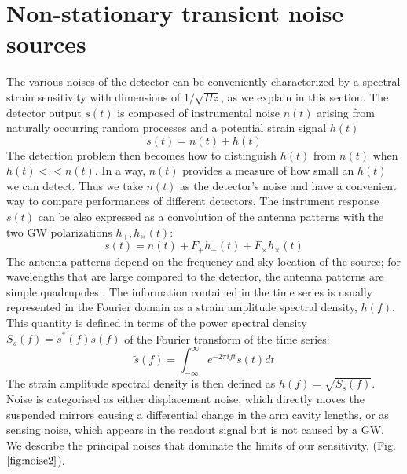 \documentclass[binding=0.6cm, LaM]{sapthesis}
\begin{document}
\section{Non-stationary transient noise sources}
	
	The various noises of the detector can be conveniently characterized by a spectral strain
        sensitivity with dimensions of $1/\sqrt{Hz}$, as we explain in this section. 
        The detector output $s(t)$ is composed of instrumental noise $n(t)$ arising from
        naturally occurring random processes and a potential strain signal $h(t)$
                \begin{equation}
                	s(t) = n(t) + h(t)
                \end{equation}
        The detection problem then becomes how to distinguish $h(t)$ from $n(t)$ when $h(t) << n(t)$.
        In a way, $n(t)$ provides a measure of how small an $h(t)$ we can detect.
        Thus we take $n(t)$ as the detector’s noise and have a convenient way to
        compare performances of different detectors.
	The instrument response $s(t)$ can be also expressed as a convolution of the antenna patterns 
	with the two GW polarizations $h_{+}, h_{\times}(t)$:
		\begin{equation}
			s(t) = n(t) +  F_{+}h_{+} (t) + F_{\times}h_{\times}(t)
		\end{equation} 
	The antenna patterns depend on the frequency and sky location of the source; 
	for wavelengths that are large compared to the detector, the antenna patterns are simple quadrupoles \cite{19}.
	The information contained in the time series is usually represented in the Fourier domain 
	as a strain amplitude spectral density, $h(f)$. \\
	This quantity is defined in terms of the power spectral density $S_s(f) = \tilde s^{*}(f) \tilde s(f)$
	of the Fourier transform of the time series:
		\begin{equation}
                	\tilde s(f) = \int^{\infty}_{-\infty} e^{-2 \pi ift} s(t)dt
		\end{equation}
	The strain amplitude spectral density is then defined as $h(f) = \sqrt{S_s(f)}$.
	Noise is categorised as either displacement noise, which directly moves the suspended mirrors
        causing a differential change in the arm cavity lengths, or as sensing noise,
        which appears in the readout signal but is not caused by a GW. \\
        We describe the principal noises that dominate the limits of our sensitivity, (Fig.$\ref{fig:noise2}$).
\end{document}
